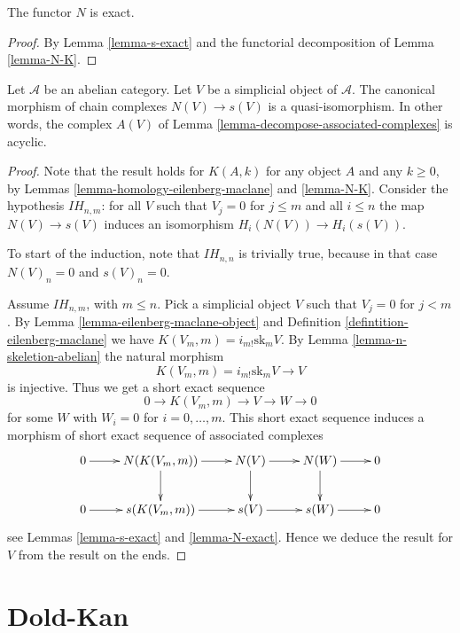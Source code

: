 \begin{lemma}
\label{lemma-N-exact}
The functor $N$ is exact.
\end{lemma}

\begin{proof}
By Lemma \ref{lemma-s-exact} and the functorial
decomposition of Lemma \ref{lemma-N-K}. 
\end{proof}

\begin{lemma}
\label{lemma-quasi-isomorphism}
Let $\mathcal{A}$ be an abelian category.
Let $V$ be a simplicial object of $\mathcal{A}$.
The canonical morphism of chain complexes
$N(V) \to s(V)$ is a quasi-isomorphism.
In other words, the complex $A(V)$ of Lemma
\ref{lemma-decompose-associated-complexes} is acyclic.
\end{lemma}

\begin{proof}
Note that the result holds for $K(A, k)$ for
any object $A$ and any $k \geq 0$, by Lemmas
\ref{lemma-homology-eilenberg-maclane} and \ref{lemma-N-K}.
Consider the hypothesis $IH_{n, m}$:
for all $V$ such that $V_j = 0$ for
$j \leq m$ and all $i \leq n$ the map
$N(V) \to s(V)$ induces an isomorphism
$H_i(N(V)) \to H_i(s(V))$.

\medskip\noindent
To start of the induction, note that $IH_{n, n}$
is trivially true, because in that case $N(V)_n = 0$
and $s(V)_n = 0$.

\medskip\noindent
Assume $IH_{n, m}$, with $m \leq n$.
Pick a simplicial object $V$ such that
$V_j = 0$ for $j < m$. By Lemma \ref{lemma-eilenberg-maclane-object}
and Definition \ref{defintition-eilenberg-maclane}
we have $K(V_m, m) = i_{m!} \text{sk}_mV$.
By Lemma \ref{lemma-n-skeletion-abelian} the natural morphism
$$
K(V_m, m) = i_{m!} \text{sk}_mV \to V
$$
is injective. Thus we get a short exact sequence
$$
0 \to K(V_m, m) \to V \to W \to 0
$$
for some $W$ with $W_i = 0$ for $i = 0, \ldots, m$. This short exact sequence
induces a morphism of short exact sequence of associated complexes 
$$
\xymatrix{
0 \ar[r] &
N(K(V_m, m)) \ar[r] \ar[d] &
N(V) \ar[r] \ar[d] &
N(W) \ar[r] \ar[d] &
0 \\
0 \ar[r] &
s(K(V_m, m)) \ar[r] &
s(V) \ar[r] &
s(W) \ar[r] &
0
}
$$
see Lemmas \ref{lemma-s-exact} and \ref{lemma-N-exact}.
Hence we deduce the result for $V$ from the result
on the ends.
\end{proof}


\section{Dold-Kan}
\label{section-dold-kan}

